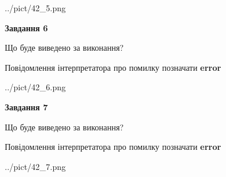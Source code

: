 \documentclass[10pt, ukrainian]{article}
\begin{document}
{\begin {large}
\begin{center}
	{../pict/42_5.png}
\end{center}
\newpage

{\begin {center}\textbf{Завдання 6}\end {center}}\par
Що буде виведено за виконання? \par
Повідомлення інтерпретатора про помилку позначати \textbf{error}

\begin{center}
	{../pict/42_6.png}
\end{center}
\newpage

{\begin {center}\textbf{Завдання 7}\end {center}}\par
Що буде виведено за виконання? \par
Повідомлення інтерпретатора про помилку позначати \textbf{error}

\begin{center}
	{../pict/42_7.png}
\end{center}
\newpage

\end {large}}
\end{document}

